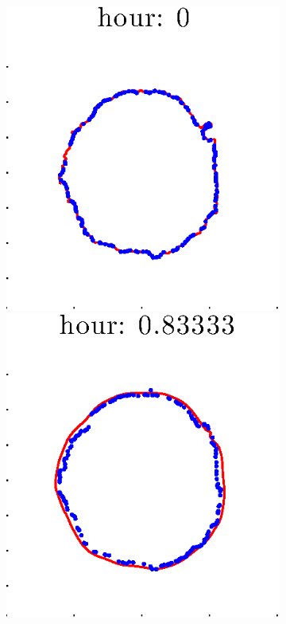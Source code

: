 \documentclass[12pt]{article}
\begin{document}
\begin{figure}[h!]
\begin{subfigure}[b]{.3\textwidth}
	\end{subfigure}
	\begin{subfigure}[b]{.3\textwidth}
	\centering
		\includegraphics[height=.15\textheight]{Pos0/secondhalf/first1.eps}
		\includegraphics[height=.15\textheight]{Pos0/secondhalf/first2.eps}

\end{subfigure}
\end{figure}
\end{document}
